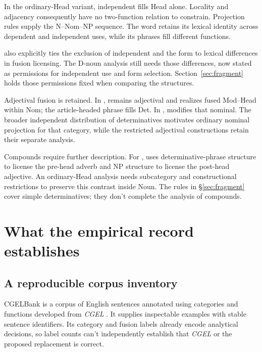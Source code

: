 \documentclass[12pt]{article}
\begin{document}
In the ordinary-Head variant, independent  fills Head alone. Locality and adjacency consequently have no two-function relation to constrain. Projection rules supply the N--Nom--NP sequence. The word  retains its lexical identity across dependent and independent uses, while its phrases fill different functions.

\textcite{Payne2007} also explicitly ties the exclusion of independent  and the form  to lexical differences in fusion licensing. The D-noun analysis still needs those differences, now stated as permissions for independent use and form selection. Section~\ref{sec:fragment} holds those permissions fixed when comparing the structures.

Adjectival fusion is retained. In ,  remains adjectival and realizes fused Mod--Head within Nom; the article-headed phrase fills Det. In ,  modifies that nominal. The broader independent distribution of determinatives motivates ordinary nominal projection for that category, while the restricted adjectival constructions retain their separate analysis.

Compounds require further description. For , \textcite{Payne2007} uses determinative-phrase structure to license the pre-head adverb and NP structure to license the post-head adjective. An ordinary-Head analysis needs subcategory and constructional restrictions to preserve this contrast inside Noun. The rules in §\ref{sec:fragment} cover simple determinatives; they don't complete the analysis of compounds.

\section{What the empirical record establishes}\label{sec:empirical}

\subsection{A reproducible corpus inventory}

CGELBank is a corpus of English sentences annotated using categories and functions developed from \textit{CGEL} \citep{reynolds2023unified}. It supplies inspectable examples with stable sentence identifiers. Its category and fusion labels already encode analytical decisions, so label counts can't independently establish that \textit{CGEL} or the proposed replacement is correct.
\end{document}
